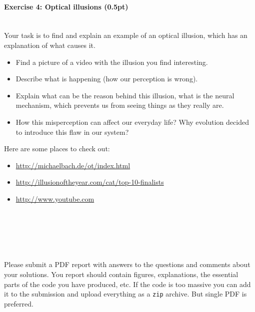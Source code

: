 \documentclass[a4paper,11pt]{article}
\newenvironment{exercise}[3]{\paragraph{Exercise #1: #2 (#3pt)}\ \\}{
\medskip}
\begin{document}
%
%
\begin{exercise}{4}{Optical illusions}{0.5}
Your task is to find and explain an example of an optical illusion, which has an explanation of what causes it.
\begin{itemize}
\itemsep 0em
	\item Find a picture of a video with the illusion you find interesting.
	\item Describe what is happening (how our perception is wrong).
	\item Explain what can be the reason behind this illusion, what is the neural mechanism, which prevents us from seeing things as they really are.
	\item How this misperception can affect our everyday life? Why evolution decided to introduce this flaw in our system?
\end{itemize}
Here are some places to check out:
\begin{itemize}
\itemsep 0em
	\item \url{http://michaelbach.de/ot/index.html}
	\item \url{http://illusionoftheyear.com/cat/top-10-finalists}
	\item \url{http://www.youtube.com}
\end{itemize}
\end{exercise}


\ \\
\ \\
\ \\
\ \\
\ \\
Please submit a PDF report with answers to the questions and comments about your solutions. You report should contain figures, explanations, the essential parts of the code you have produced, etc. If the code is too massive you can add it to the submission and upload everything as a \texttt{zip} archive. But single PDF is preferred.
\end{document}
